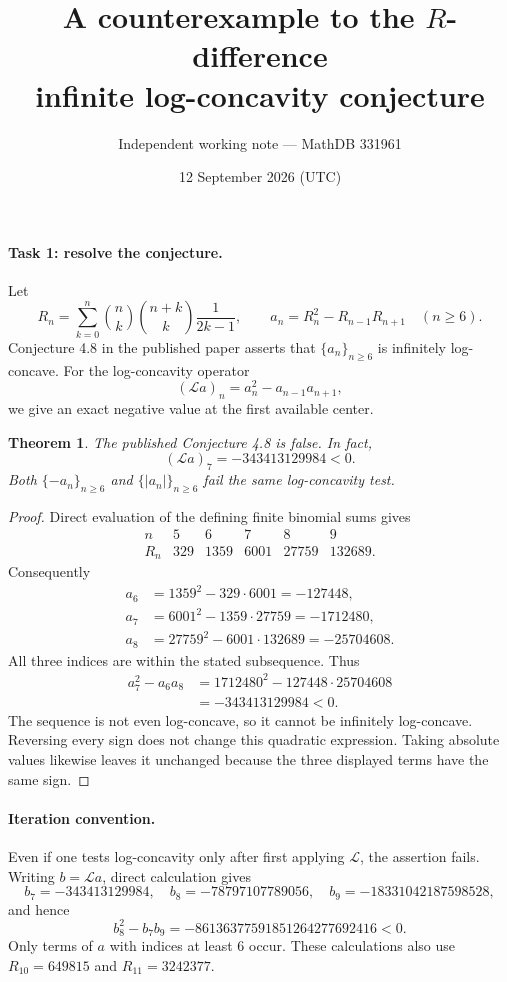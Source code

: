 \documentclass[11pt]{article}
\title{A counterexample to the \(R\)-difference\\infinite log-concavity conjecture}
\author{Independent working note --- MathDB 331961}
\date{12 September 2026 (UTC)}
\newtheorem{theorem}{Theorem}
\begin{document}
\maketitle
\paragraph{Task 1: resolve the conjecture.}
Let
\[
 R_n=\sum_{k=0}^n\binom nk\binom{n+k}k\frac1{2k-1},
 \qquad a_n=R_n^2-R_{n-1}R_{n+1}\quad(n\ge6).
\]
Conjecture 4.8 in the published paper \cite{sun} asserts that
\(\{a_n\}_{n\ge6}\) is infinitely log-concave.
For the log-concavity operator
\[
 (\mathcal L a)_n=a_n^2-a_{n-1}a_{n+1},
\]
we give an exact negative value at the first available center.

\begin{theorem}
The published Conjecture 4.8 is false. In fact,
\[
 (\mathcal L a)_7=-343413129984<0.
\]
Both \(\{-a_n\}_{n\ge6}\) and \(\{|a_n|\}_{n\ge6}\) fail the same
log-concavity test.
\end{theorem}
\begin{proof}
Direct evaluation of the defining finite binomial sums gives
\[
\begin{array}{c|rrrrr}
 n&5&6&7&8&9\\ \hline
 R_n&329&1359&6001&27759&132689.
\end{array}
\]
Consequently
\begin{align*}
 a_6&=1359^2-329\cdot6001=-127448,\\
 a_7&=6001^2-1359\cdot27759=-1712480,\\
 a_8&=27759^2-6001\cdot132689=-25704608.
\end{align*}
All three indices are within the stated subsequence. Thus
\begin{align*}
 a_7^2-a_6a_8
 &=1712480^2-127448\cdot25704608\\
 &=-343413129984<0.
\end{align*}
The sequence is not even log-concave, so it cannot be infinitely
log-concave. Reversing every sign does not change this quadratic
expression. Taking absolute values likewise leaves it unchanged
because the three displayed terms have the same sign.
\end{proof}

\paragraph{Iteration convention.}
Even if one tests log-concavity only after first applying \(\mathcal L\),
the assertion fails. Writing \(b=\mathcal L a\), direct calculation gives
\[
 b_7=-343413129984,\quad b_8=-78797107789056,\quad
 b_9=-18331042187598528,
\]
and hence
\[
 b_8^2-b_7b_9=-86136377591851264277692416<0.
\]
Only terms of \(a\) with indices at least \(6\) occur. These
calculations also use \(R_{10}=649815\) and \(R_{11}=3242377\).
\end{document}
